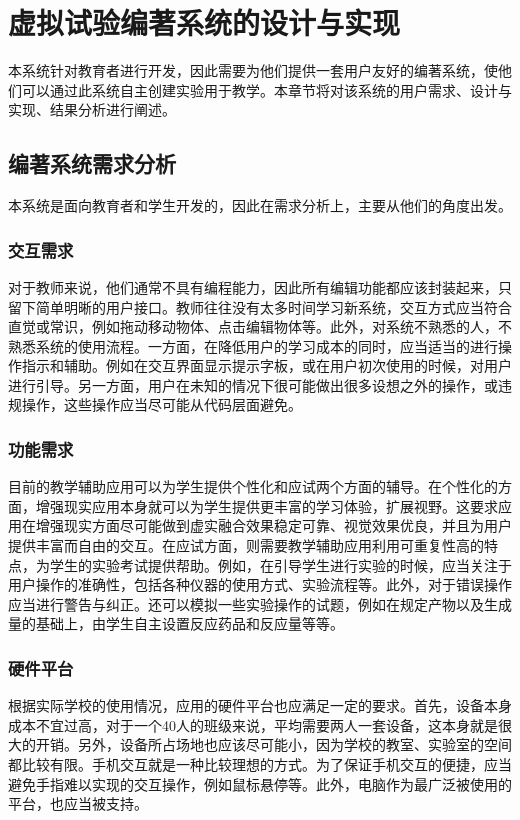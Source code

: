 \chapter{虚拟试验编著系统的设计与实现}
\label{report}

本系统针对教育者进行开发，因此需要为他们提供一套用户友好的编著系统，使他们可以通过此系统自主创建实验用于教学。本章节将对该系统的用户需求、设计与实现、结果分析进行阐述。

\section{编著系统需求分析}
本系统是面向教育者和学生开发的，因此在需求分析上，主要从他们的角度出发。

\subsection{交互需求}
对于教师来说，他们通常不具有编程能力，因此所有编辑功能都应该封装起来，只留下简单明晰的用户接口。教师往往没有太多时间学习新系统，交互方式应当符合直觉或常识，例如拖动移动物体、点击编辑物体等。此外，对系统不熟悉的人，不熟悉系统的使用流程。一方面，在降低用户的学习成本的同时，应当适当的进行操作指示和辅助。例如在交互界面显示提示字板，或在用户初次使用的时候，对用户进行引导。另一方面，用户在未知的情况下很可能做出很多设想之外的操作，或违规操作，这些操作应当尽可能从代码层面避免。

\subsection{功能需求}
目前的教学辅助应用可以为学生提供个性化和应试两个方面的辅导。在个性化的方面，增强现实应用本身就可以为学生提供更丰富的学习体验，扩展视野。这要求应用在增强现实方面尽可能做到虚实融合效果稳定可靠、视觉效果优良，并且为用户提供丰富而自由的交互。在应试方面，则需要教学辅助应用利用可重复性高的特点，为学生的实验考试提供帮助。例如，在引导学生进行实验的时候，应当关注于用户操作的准确性，包括各种仪器的使用方式、实验流程等。此外，对于错误操作应当进行警告与纠正。还可以模拟一些实验操作的试题，例如在规定产物以及生成量的基础上，由学生自主设置反应药品和反应量等等。

\subsection{硬件平台}
根据实际学校的使用情况，应用的硬件平台也应满足一定的要求。首先，设备本身成本不宜过高，对于一个40人的班级来说，平均需要两人一套设备，这本身就是很大的开销。另外，设备所占场地也应该尽可能小，因为学校的教室、实验室的空间都比较有限。手机交互就是一种比较理想的方式。为了保证手机交互的便捷，应当避免手指难以实现的交互操作，例如鼠标悬停等。此外，电脑作为最广泛被使用的平台，也应当被支持。

